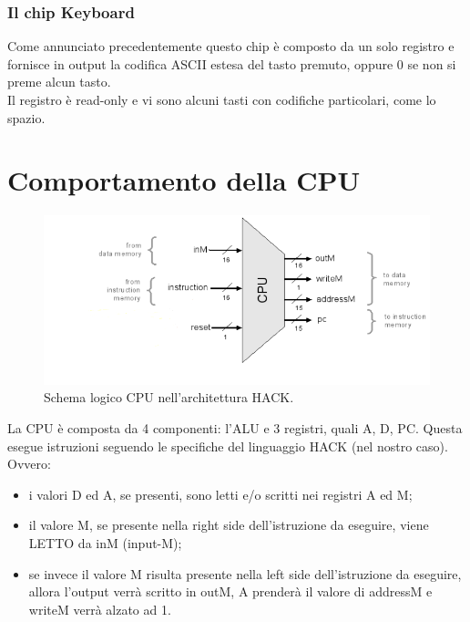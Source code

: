 \documentclass[12pt]{article}
\begin{document}
\subsubsection{Il chip Keyboard}
\label{sssec:keyboard_chip}
Come annunciato precedentemente questo chip è composto da un solo registro e fornisce in output la codifica ASCII estesa del tasto premuto, oppure 0 se non si preme alcun tasto.
\\
Il registro è read-only e vi sono alcuni tasti con codifiche particolari, come lo spazio.

\section{Comportamento della CPU}
\label{sec:CPU}
\begin{figure}[H]
    \centering
    \includegraphics[width=1\textwidth, height=.7\textheight,keepaspectratio]{realizzare_HACK/CPU.png} %
    \begin{center}
        \caption{\label{fig:come_funziona_CPU}Schema logico CPU nell'architettura HACK.} %
    \end{center}
\end{figure}
La CPU è composta da 4 componenti: l'ALU e 3 registri, quali A, D, PC.
Questa esegue istruzioni seguendo le specifiche del linguaggio HACK (nel nostro caso). Ovvero:
\begin{itemize}
    \item i valori D ed A, se presenti, sono letti e/o scritti nei registri A ed M;
    \item il valore M, se presente nella right side dell'istruzione da eseguire, viene LETTO da inM (input-M);
    \item se invece il valore M risulta presente nella left side dell'istruzione da eseguire, allora
            l'output verrà scritto in outM, A prenderà il valore di addressM e writeM verrà alzato ad 1.
\end{itemize}
\end{document}
